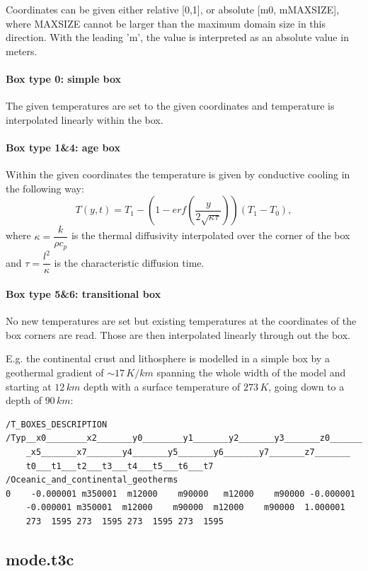 Coordinates can be given either relative [0,1], or absolute [m0, mMAXSIZE], where MAXSIZE cannot be larger than the maximum domain size in this direction. With the leading 'm', the value is interpreted as an absolute value in meters.

\paragraph{Box type 0: simple box}
The given temperatures are set to the given coordinates and temperature is interpolated linearly within the box.

\paragraph{Box type 1\&4: age box}
Within the given coordinates the temperature is given by conductive cooling in the following way:
\begin{equation}\label{eqs:cond_cooling}
T(y,t)=T_1-(1-erf(\dfrac{y}{2\sqrt{\kappa\tau}}))(T_1-T_0),
\end{equation}
where $\kappa=\dfrac{k}{\rho c_p}$ is the thermal diffusivity interpolated over the corner of the box and $\tau=\dfrac{l^2}{\kappa}$ is the characteristic diffusion time.

\paragraph{Box type 5\&6: transitional box}
No new temperatures are set but existing temperatures at the coordinates of the box corners are read. Those are then interpolated linearly through out the box.

E.g. the continental crust and lithosphere is modelled in a simple box by a geothermal gradient of $\sim17\,K/km$ spanning the whole width of the model and starting at $12\,km$ depth with a surface temperature of $273\,K$, going down to a depth of $90\,km$:
\lstset{basicstyle=\small}
\begin{lstlisting}
/T_BOXES_DESCRIPTION
/Typ__x0________x2_______y0________y1_______y2_______y3_______z0_______
	_x5_______x7_______y4_______y5_______y6_______y7_______z7_______
	t0___t1___t2___t3___t4___t5___t6___t7
/Oceanic_and_continental_geotherms
0    -0.000001 m350001  m12000    m90000   m12000    m90000 -0.000001
	-0.000001 m350001  m12000    m90000  m12000    m90000  1.000001
	273  1595 273  1595 273  1595 273  1595
\end{lstlisting}

\subsection{mode.t3c}

